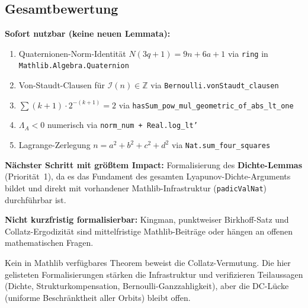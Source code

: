 \documentclass[12pt,a4paper]{article}
\newcommand{\Z}{\mathbb{Z}}
\newcommand{\Mathlib}[1]{\texttt{Mathlib.\allowbreak #1}}
\begin{document}
\subsection{Gesamtbewertung}

\begin{tcolorbox}[kernidee, title={Strategische Empfehlung}]
\textbf{Sofort nutzbar (keine neuen Lemmata):}
\begin{enumerate}[nosep, label=(\arabic*)]
  \item Quaternionen-Norm-Identität $N(3q+1) = 9n+6a+1$
    via \texttt{ring} in \Mathlib{Algebra.Quaternion}
  \item Von-Staudt-Clausen für $\mathcal{I}(n) \in \Z$
    via \texttt{Bernoulli.vonStaudt\_clausen}
  \item $\sum(k+1)\cdot 2^{-(k+1)} = 2$
    via \texttt{hasSum\_pow\_mul\_geometric\_of\_abs\_lt\_one}
  \item $\Lambda_A < 0$ numerisch
    via \texttt{norm\_num + Real.log\_lt'}
  \item Lagrange-Zerlegung $n = a^2+b^2+c^2+d^2$
    via \texttt{Nat.sum\_four\_squares}
\end{enumerate}

\medskip
\textbf{Nächster Schritt mit größtem Impact:}
Formalisierung des \textbf{Dichte-Lemmas} (Priorität~1), da es das
Fundament des gesamten Lyapunov-Dichte-Arguments bildet und direkt
mit vorhandener Mathlib-Infrastruktur (\texttt{padicValNat}) durchführbar ist.

\medskip
\textbf{Nicht kurzfristig formalisierbar:}
Kingman, punktweiser Birkhoff-Satz und Collatz-Ergodizität sind
mittelfristige Mathlib-Beiträge oder hängen an offenen mathematischen Fragen.
\end{tcolorbox}

\begin{tcolorbox}[warnung, title={Wichtige Einschränkung}]
Kein in Mathlib verfügbares Theorem beweist die Collatz-Vermutung.
Die hier gelisteten Formalisierungen stärken die Infrastruktur und
verifizieren Teilaussagen (Dichte, Strukturkompensation, Bernoulli-Ganzzahligkeit),
aber die DC-Lücke (uniforme Beschränktheit aller Orbits) bleibt offen.
\end{tcolorbox}
\end{document}
